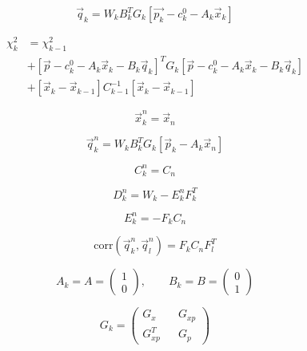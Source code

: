 \begin{equation}
\vec{q}_k = W_k B_k^T G_k \left[
	\vec{p_k} - c_k^0 - A_k \vec{x}_k
\right]
\end{equation}

\begin{equation}
\begin{aligned}
\chi^2_k &= \chi^2_{k-1} \\
&+
\left[
	\vec{p} - c_k^0 - A_k \vec{x}_k - B_k\vec{q}_k
\right]^T G_k \left[
	\vec{p} - c_k^0 - A_k \vec{x}_k - B_k\vec{q}_k
\right] \\
&+
\left[
	\vec{x}_k - \vec{x}_{k-1}
\right] C_{k-1}^{-1} \left[
	\vec{x}_k - \vec{x}_{k-1}
\right]
\end{aligned}
\end{equation}

\begin{equation}
\vec{x}_k^n = \vec{x}_n
\end{equation}

\begin{equation}
\vec{q}_k^n = W_k B_k^T G_k \left[
	\vec{p}_k - A_k \vec{x}_n
\right]
\end{equation}

\begin{equation}
C_k^n = C_n
\end{equation}

\begin{equation}
D_k^n = W_k - E_k^n F_k^T
\end{equation}

\begin{equation}
E_k^n = - F_k C_n
\end{equation}

\begin{equation}
\text{corr}\left(
	\vec{q}_k^n, \vec{q}_l^n
\right) = F_k C_n F_l^T
\end{equation}

\begin{equation}
A_k = A = \begin{pmatrix}
1 \\
0
\end{pmatrix},
\quad\quad 
B_k = B = \begin{pmatrix}
0 \\
1
\end{pmatrix}
\end{equation}

\begin{equation}
G_k = \begin{pmatrix}
G_x 		&& G_{xp} \\
G^T_{xp} 	&& G_p
\end{pmatrix}
\end{equation}

